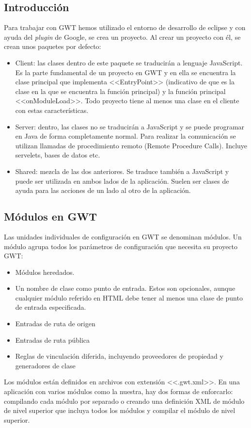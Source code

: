 \subsection{Introducción}
Para trabajar con GWT hemos utilizado el entorno de desarrollo de eclipse y con ayuda del \emph{plugin} de Google, se crea un proyecto. Al crear un proyecto con él, se crean unos paquetes por defecto:
\begin{itemize}
\item Client: las clases dentro de este paquete se traducirán a lenguaje JavaScript. Es la parte fundamental de un proyecto en GWT y en ella se encuentra la clase principal que implementa <<EntryPoint>>  (indicativo de que es la clase en la que se encuentra la función principal) y la función principal <<onModuleLoad>>. Todo proyecto tiene al menos una clase en el cliente con estas características.
\item Server: dentro, las clases no se traducirán a JavaScript y se puede programar en Java de forma completamente normal. Para realizar la comunicación se utilizan llamadas de procedimiento remoto (Remote Procedure Calls). Incluye servelets, bases de datos etc.
\item Shared: mezcla de las dos anteriores. Se traduce también a JavaScript y puede ser utilizada en ambos lados de la aplicación. Suelen ser clases de ayuda para las acciones de un lado al otro de la aplicación.
\end{itemize}

\subsection{Módulos en GWT}

Las unidades individuales de configuración en GWT se denominan módulos. Un módulo agrupa todos los parámetros de configuración que necesita su proyecto GWT:

\begin{itemize}

\item Módulos heredados.
\item Un nombre de clase como punto de entrada. Estos son opcionales, aunque cualquier módulo referido en HTML debe tener al menos una clase de punto de entrada especificada.
\item Entradas de ruta de origen
\item Entradas de ruta pública
\item Reglas de vinculación diferida, incluyendo proveedores de propiedad y generadores de clase

\end{itemize}
Los módulos están definidos en archivos con extensión <<.gwt.xml>>. En una aplicación con varios módulos como la nuestra, hay dos formas de enforcarlo: compilando cada módulo por separado o creando una definición XML de módulo de nivel superior que incluya todos los módulos y compilar el módulo de nivel superior.

